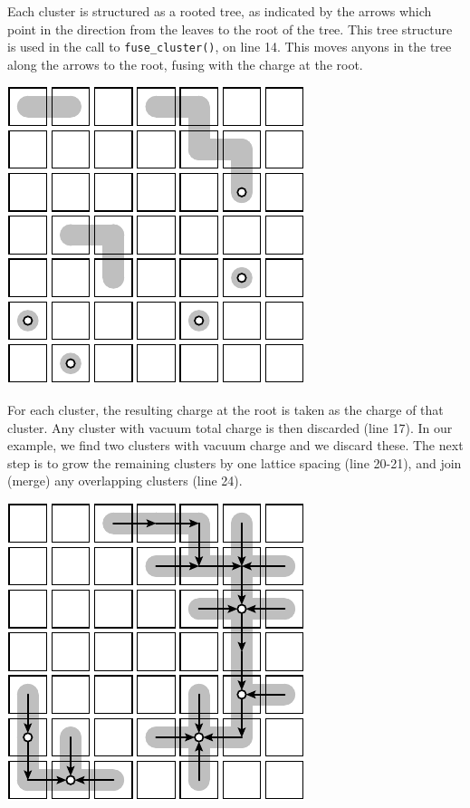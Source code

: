 Each cluster is structured as a rooted tree, as indicated by
the arrows which point in the direction from the leaves to
the root of the tree. 
This tree structure is used in the call to {\tt fuse\_cluster()},
on line 14.
This moves anyons in the tree along the arrows to the root, 
fusing with the charge at the root.
\begin{center}
\includegraphics[]{pic-decode-2.pdf}
\end{center}

For each cluster, the resulting charge at the root is taken as the charge of
that cluster. Any cluster with vacuum total charge is then discarded (line 17).
In our example, we find two clusters with vacuum charge and we discard these.
The next step is to grow the remaining clusters by one lattice spacing (line 20-21),
and join (merge) any overlapping clusters (line 24).
\begin{center}
\includegraphics[]{pic-decode-3.pdf}
\end{center}

